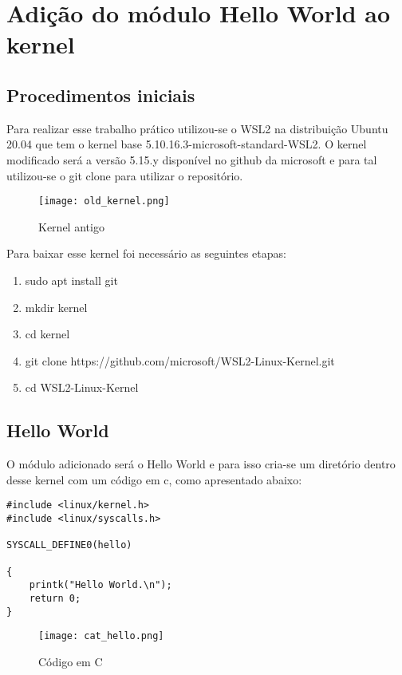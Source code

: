 \documentclass[a4paper, 12pt]{article}
\begin{document}
\newpage
{}
\section{Adição do módulo Hello World ao kernel}

\subsection{Procedimentos iniciais}
Para realizar esse trabalho prático utilizou-se o WSL2 na distribuição Ubuntu 20.04 que tem o kernel base 5.10.16.3-microsoft-standard-WSL2. O kernel modificado será a versão 5.15.y disponível no github da microsoft e para tal utilizou-se o git clone para utilizar o repositório. 

\begin{figure}[h]
\centering 
\texttt{[image: old\_kernel.png]}
\label{figura:qualquernome}
\caption{Kernel antigo}
\end{figure}

Para baixar esse kernel foi necessário as seguintes etapas:

\begin{enumerate}
    \item sudo apt install git
    \item mkdir kernel
    \item cd kernel
    \item git clone https://github.com/microsoft/WSL2-Linux-Kernel.git
    \item cd WSL2-Linux-Kernel
\end{enumerate}

\subsection{Hello World}
O módulo adicionado será o Hello World e para isso cria-se um diretório dentro desse kernel com um código em c, como apresentado abaixo:

\begin{lstlisting} 
#include <linux/kernel.h>
#include <linux/syscalls.h>

SYSCALL_DEFINE0(hello)

{
    printk("Hello World.\n");
    return 0;
} 
\end{lstlisting}

\begin{figure}[h]
\centering 
\texttt{[image: cat\_hello.png]}
\label{figura:qualquernome}
\caption{Código em C}
\end{figure}
\end{document}
